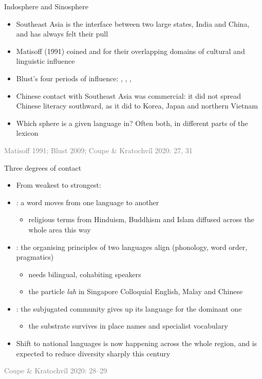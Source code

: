 \documentclass{beamer}
\newcommand{\asrc}[1]{{\par\raggedleft\tiny\textcolor{gray}{#1}\par}}
\begin{document}
\begin{frame}{Indosphere and Sinosphere}
  \begin{itemize}
  \item Southeast Asia is the interface between two large states, India
    and China, and has always felt their pull
  \item Matisoff (1991) coined  and  for their
    overlapping domains of cultural and linguistic influence
  \item Blust's four periods of influence: , , , 
  \item Chinese contact with Southeast Asia was commercial: it did not
    spread Chinese literacy southward, as it did to Korea, Japan and northern
    Vietnam
  \item[?] Which sphere is a given language in?  Often both, in different
    parts of the lexicon
  \end{itemize}
  \asrc{Matisoff 1991; Blust 2009; Coupe \& Kratochvíl 2020: 27, 31}
\end{frame}

\begin{frame}{Three degrees of contact}
  \begin{itemize}
  \item From weakest to strongest:
  \item {}: a word moves from one language to another
    \begin{itemize}
    \item religious terms from Hinduism, Buddhism and Islam diffused across
      the whole area this way
    \end{itemize}
  \item {}: the organising principles
    of two languages align (phonology, word order, pragmatics)
    \begin{itemize}
    \item needs bilingual, cohabiting speakers
    \item the particle \emph{lah} in Singapore Colloquial English, Malay and
      Chinese
    \end{itemize}
  \item {}: the subjugated community gives up its language
    for the dominant one
    \begin{itemize}
    \item the substrate survives in place names and specialist vocabulary
    \end{itemize}
  \item Shift to national languages is now happening across the whole
    region, and is expected to reduce diversity sharply this century
  \end{itemize}
  \asrc{Coupe \& Kratochvíl 2020: 28--29}
\end{frame}
\end{document}
